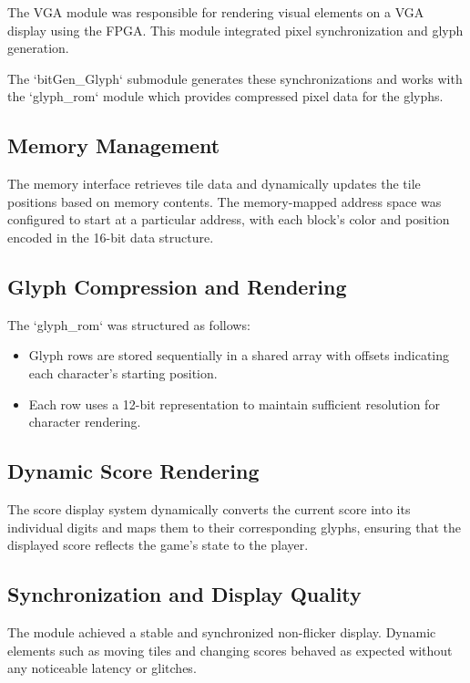 \documentclass{subfile}
\begin{document}

  The VGA module was responsible for rendering visual elements on a VGA display using the FPGA. This module integrated pixel synchronization and glyph generation.

  The `bitGen\_Glyph` submodule generates these synchronizations and works with the `glyph\_rom` module which provides compressed pixel data for the glyphs.

  \subsection{Memory Management}
  The memory interface retrieves tile data and dynamically updates the tile positions based on memory contents. The memory-mapped address space was configured to start at a particular address, with each block's color and position encoded in the 16-bit data structure. 

  \subsection{Glyph Compression and Rendering}
  The `glyph\_rom` was structured as follows:
  \begin{itemize}
      \item Glyph rows are stored sequentially in a shared array with offsets indicating each character's starting position.
      \item Each row uses a 12-bit representation to maintain sufficient resolution for character rendering.
  \end{itemize}

  \subsection{Dynamic Score Rendering}
  The score display system dynamically converts the current score into its individual digits and maps them to their corresponding glyphs, ensuring that the displayed score reflects the game's state to the player. 

  \subsection{Synchronization and Display Quality}
  The module achieved a stable and synchronized non-flicker display. Dynamic elements such as moving tiles and changing scores behaved as expected without any noticeable latency or glitches.
\end{document}
